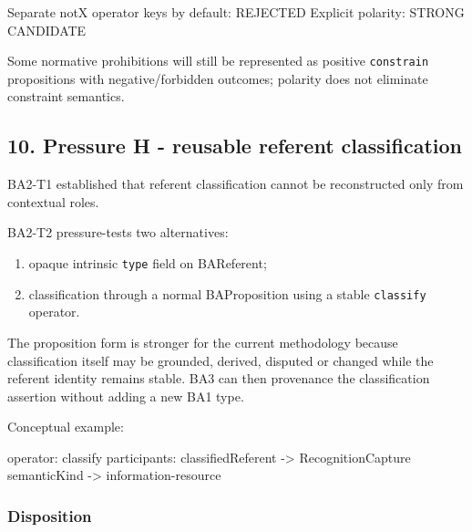 \documentclass[
  10pt,
  letterpaper,
]{article}
\newenvironment{Shaded}{}{}
\newcommand{\NormalTok}[1]{#1}
\providecommand{\tightlist}{%
  \setlength{\itemsep}{0pt}\setlength{\parskip}{0pt}}
\begin{document}
\begin{Shaded}
\begin{Highlighting}[]
\NormalTok{Separate notX operator keys by default: REJECTED}
\NormalTok{Explicit polarity: STRONG CANDIDATE}
\end{Highlighting}
\end{Shaded}

Some normative prohibitions will still be represented as positive
\texttt{constrain} propositions with negative/forbidden outcomes;
polarity does not eliminate constraint semantics.

\subsection{10. Pressure H - reusable referent
classification}\label{pressure-h---reusable-referent-classification}

BA2-T1 established that referent classification cannot be reconstructed
only from contextual roles.

BA2-T2 pressure-tests two alternatives:

\begin{enumerate}
\def\labelenumi{\arabic{enumi}.}
\tightlist
\item
  opaque intrinsic \texttt{type} field on BAReferent;
\item
  classification through a normal BAProposition using a stable
  \texttt{classify} operator.
\end{enumerate}

The proposition form is stronger for the current methodology because
classification itself may be grounded, derived, disputed or changed
while the referent identity remains stable. BA3 can then provenance the
classification assertion without adding a new BA1 type.

Conceptual example:

\begin{Shaded}
\begin{Highlighting}[]
\NormalTok{operator: classify}
\NormalTok{participants:}
\NormalTok{  classifiedReferent {-}\textgreater{} RecognitionCapture}
\NormalTok{  semanticKind       {-}\textgreater{} information{-}resource}
\end{Highlighting}
\end{Shaded}

\subsubsection{Disposition}\label{disposition-6}
\end{document}
